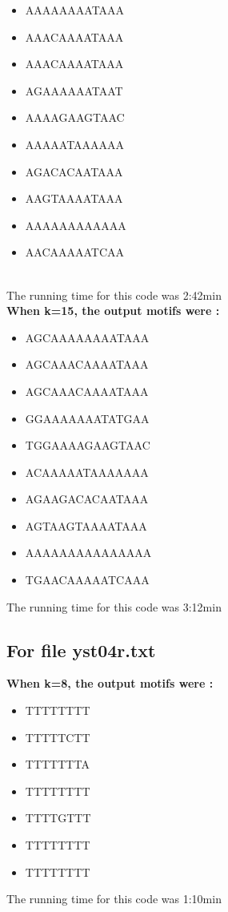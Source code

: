 \documentclass{report}
\begin{document}
\begin{itemize}
    \item AAAAAAAATAAA
    \item AAACAAAATAAA
    \item AAACAAAATAAA
    \item AGAAAAAATAAT
    \item AAAAGAAGTAAC
    \item AAAAATAAAAAA
    \item AGACACAATAAA
    \item AAGTAAAATAAA
    \item AAAAAAAAAAAA
    \item AACAAAAATCAA
\end{itemize}\\
The running time for this code was 2:42min\\
\textbf{When k=15, the output motifs were : }
\begin{itemize}
    \item AGCAAAAAAAATAAA
    \item AGCAAACAAAATAAA
    \item AGCAAACAAAATAAA
    \item GGAAAAAAATATGAA
    \item TGGAAAAGAAGTAAC
    \item ACAAAAATAAAAAAA
    \item AGAAGACACAATAAA
    \item AGTAAGTAAAATAAA
    \item AAAAAAAAAAAAAAA
    \item TGAACAAAAATCAAA
\end{itemize}
The running time for this code was 3:12min\\







\subsection{For file yst04r.txt}
\textbf{When k=8, the output motifs were : }
\begin{itemize}
    \item TTTTTTTT
    \item TTTTTCTT
    \item TTTTTTTA
    \item TTTTTTTT
    \item TTTTGTTT
    \item TTTTTTTT
    \item TTTTTTTT
\end{itemize}
The running time for this code was 1:10min\\
\end{document}
